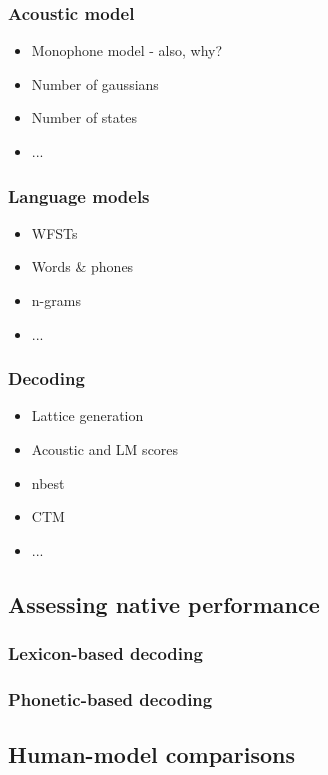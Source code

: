 \subsubsection{Acoustic model}
\begin{itemize}
\item Monophone model - also, why?
\item Number of gaussians
\item Number of states
\item ...
\end{itemize}
    
\subsubsection{Language models}
\begin{itemize}
\item WFSTs
\item Words \& phones 
\item n-grams
\item ...
\end{itemize}

\subsubsection{Decoding}
\begin{itemize}
\item Lattice generation
\item Acoustic and LM scores 
\item nbest
\item CTM
\item ...
\end{itemize}

\subsection{Assessing native performance}
\subsubsection{Lexicon-based decoding}
\subsubsection{Phonetic-based decoding}

\subsection{Human-model comparisons}
